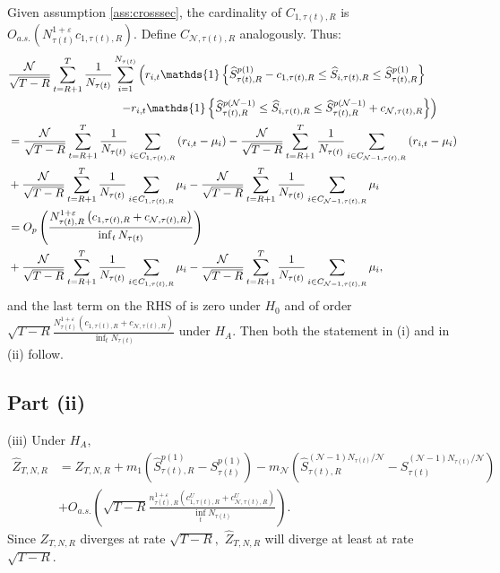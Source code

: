 \noindent Given assumption \ref{ass:crosssec}, the cardinality of $C_{1,\tau(t),R}$ is $O_{a.s.}\left( N_{\tau(t)}^{1+\varepsilon }c_{1,\tau(t),R} \right)$. Define $C_{\mathcal{N},\tau(t),R}$ analogously. Thus:
\begin{align}
    &\frac{\mathcal{N}}{\sqrt{T-R}}\sum_{t=R+1}^{T}\frac{1}{N_{\tau(t)}}\sum_{i=1}^{N_{\tau(t)}}\left( r_{i,t}\mathds{1} \left\{ \widehat{S}_{\tau(t),R}^{p(1)}-c_{1,\tau(t),R} \leq \widehat{S}_{i,\tau(t),R}\leq \widehat{S}_{\tau(t),R}^{p(1)}\right\} \right. \notag \\
    &\hspace{3.4cm} \left. -r_{i,t}\mathds{1} \left\{ \widehat{S}_{\tau(t),R}^{p(\mathcal{N}-1)} \leq \widehat{S}_{i,\tau(t),R}\leq \widehat{S}_{\tau(t),R}^{p(\mathcal{N}-1)}+c_{\mathcal{N},\tau(t),R} \right\} \right) \notag \\
    &=\frac{\mathcal{N}}{\sqrt{T-R}}\sum_{t=R+1}^{T}\frac{1}{N_{\tau(t)}}\sum_{i\in C_{1,\tau(t),R}} \left( r_{i,t}-\mu_{i}\right) -\frac{\mathcal{N}}{\sqrt{T-R}} \sum_{t=R+1}^{T} \frac{1}{N_{\tau(t)}} \sum_{i\in C_{\mathcal{N}-1,\tau(t),R}} \left( r_{i,t} - \mu_{i} \right) \notag \\
    &+\frac{\mathcal{N}}{\sqrt{T-R}}\sum_{t=R+1}^{T}\frac{1}{N_{\tau(t)}}\sum_{i\in C_{1,\tau(t),R}} \mu_{i}-\frac{\mathcal{N}}{\sqrt{T-R}}\sum_{t=R+1}^{T}\frac{1}{N_{\tau(t)}}\sum_{i\in C_{\mathcal{N}-1,\tau(t),R}} \mu_{i}  \notag \\
    &=O_p \left( \frac{N_{\tau(t),R}^{1+\varepsilon }\left( c_{1,\tau(t),R} + c_{\mathcal{N},\tau(t),R} \right) }{\inf_{t}N_{\tau(t)}}\right) \notag \\
    &+\frac{\mathcal{N}}{\sqrt{T-R}}\sum_{t=R+1}^{T}\frac{1}{N_{\tau(t)}}\sum_{i\in C_{1,\tau(t),R}} \mu_{i} - \frac{\mathcal{N}}{\sqrt{T-R}} \sum_{t=R+1}^{T} \frac{1}{N_{\tau(t)}} \sum_{i \in C_{\mathcal{N}-1,\tau(t),R}} \mu_{i}, %
\end{align}
and the last term on the RHS of %
is zero under $H_0$ and of order $\sqrt{T-R}\frac{N_{\tau(t)}^{1+\varepsilon }\left(c_{1,\tau(t),R} + c_{\mathcal{N},\tau(t),R} \right) }{\inf_t N_{\tau(t)}}$ under $H_A$. Then both the statement in (i) and in (ii) follow.

\subsection{Part (ii)}

\noindent (iii) Under $H_{A},$%
\begin{align*}
\widehat{Z}_{T,N,R} &=Z_{T,N,R}+m_{1}\left( \widehat{S}_{\tau(t),R}^{p(1)}-S_{\tau(t)}^{p(1)}\right) -m_{\mathcal{N}}\left( \widehat{S}_{\tau(t),R}^{(\mathcal{N-}1)N_{\tau(t)}/\mathcal{N}}-S_{\tau(t)}^{(\mathcal{N-} 1)N_{\tau(t)}/\mathcal{N}}\right)  \\
&+O_{a.s.}\left( \sqrt{T-R}\frac{n_{\tau(t),R}^{1+\varepsilon }\left( c_{1,\tau(t),R}^{U}+c_{\mathcal{N},\tau(t),R}^{U}\right) }{\inf_{t}N_{\tau(t)}}\right).
\end{align*}
Since $Z_{T,N,R}$ diverges at rate $\sqrt{T-R},$ $\widehat{Z}_{T,N,R}$ will diverge at least at rate $\sqrt{T-R}.$


